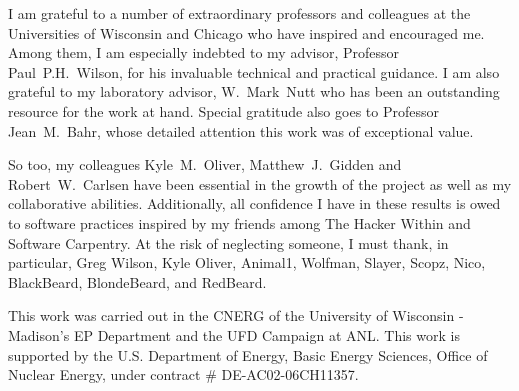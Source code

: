 I am grateful to a number of extraordinary professors and colleagues at the 
Universities of Wisconsin and Chicago who have inspired and encouraged me.  
Among  them, I am especially indebted to my advisor, Professor 
Paul~P.H.~Wilson, for his invaluable technical and practical guidance. I am 
also grateful to my laboratory advisor, W.~Mark~Nutt who has been an 
outstanding resource for the work at hand. Special gratitude also goes to 
Professor Jean~M.~Bahr, whose detailed attention this work was of exceptional 
value. 

So too, my colleagues Kyle~M.~Oliver, Matthew~J.~Gidden and Robert~W.~Carlsen 
have been essential in the growth of the \Cyclus project as well as my 
collaborative abilities.  Additionally, all confidence I have in these results 
is owed to software practices inspired by my friends among The Hacker Within 
and Software Carpentry. At the risk of neglecting someone, I must thank, in 
particular, Greg Wilson, Kyle Oliver, Animal1, Wolfman, Slayer, Scopz, Nico,  
BlackBeard, BlondeBeard, and RedBeard.

This work was carried out in the \gls{CNERG} of the University of Wisconsin - 
Madison's \gls{EP} Department and the \gls{UFD} Campaign at \gls{ANL}. This 
work is supported by the U.S. Department of Energy, Basic Energy Sciences, 
Office of Nuclear Energy, under contract \# DE-AC02-06CH11357.
